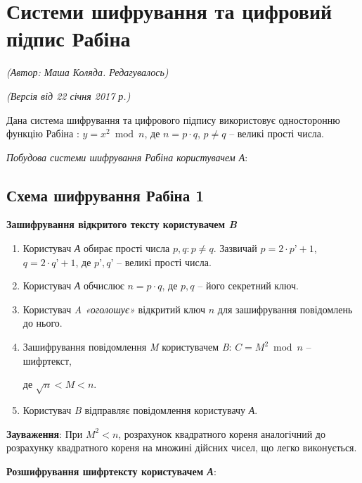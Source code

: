 \section{Системи шифрування та цифровий підпис Рабіна}
\begin{flushright}
\emph{(Автор: Маша Коляда. Редагувалось)}
\par \emph{(Версія від 22 січня 2017 р.)}
\end{flushright}

Дана система шифрування та цифрового підпису використовує односторонню функцію Рабіна : $y=x^2 \bmod n$, де $n=p \cdot q$, $p\ne q$ -- великі прості числа.

\textit{Побудова системи шифрування Рабіна користувачем А}:
\subsection{Схема шифрування Рабіна 1}

\begin{center}
 \textbf{Зашифрування відкритого тексту користувачем \textsl{B}}
\end{center}

\begin{enumerate}
        \item Користувач \textsl{А} обирає прості числа $p,q : p\ne q$. Зазвичай $p=2 \cdot p’+1$,  $q=2 \cdot q’+1$, де $p’, q’$ -- великі прості числа.
        \item Користувач \textsl{А} обчислює $n=p \cdot q$, де $p, q$ -- його секретний ключ.
        \item Користувач \textsl{A} \textit{«оголошує»} відкритий ключ $n$ для зашифрування повідомлень до нього.
        \item Зашифрування повідомлення \textsl{M} користувачем \textsl{B}: $ C=M^2 \bmod n$ – шифртекст, \par
         де $\sqrt{n}<M<n$.
        \item Користувач \textsl{B} відправляє повідомлення користувачу \textsl{А}.    
\end{enumerate}
\textbf{Зауваження}:  При $M^2<n$, розрахунок квадратного кореня аналогічний до розрахунку квадратного кореня на множині дійсних чисел, що легко виконується.\\

\begin{center}
\textbf{Розшифрування шифртексту користувачем  \textsl{А}}:
\end{center}

